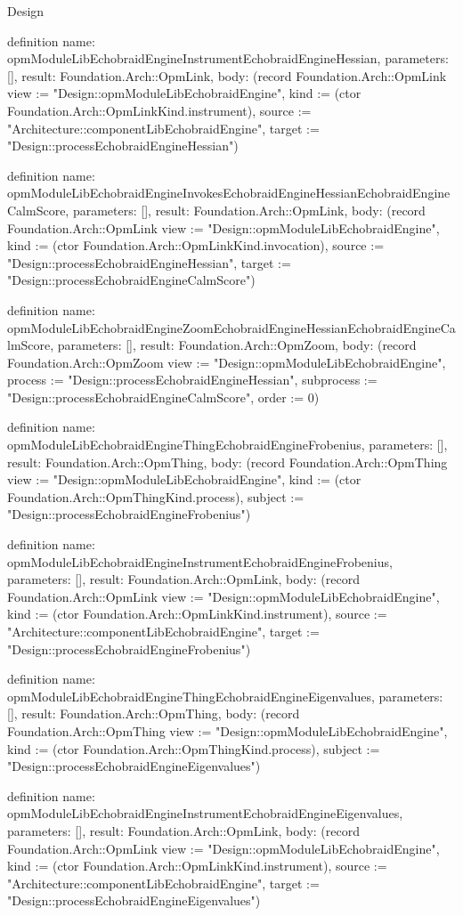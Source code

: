 \begin{lexlean}{Design}
\begin{semanticmodule}
definition{
  name: opmModuleLibEchobraidEngineInstrumentEchobraidEngineHessian,
  parameters: [],
  result: Foundation.Arch::OpmLink,
  body: (record Foundation.Arch::OpmLink {view := "Design::opmModuleLibEchobraidEngine", kind := (ctor Foundation.Arch::OpmLinkKind.instrument), source := "Architecture::componentLibEchobraidEngine", target := "Design::processEchobraidEngineHessian"})
}

definition{
  name: opmModuleLibEchobraidEngineInvokesEchobraidEngineHessianEchobraidEngineCalmScore,
  parameters: [],
  result: Foundation.Arch::OpmLink,
  body: (record Foundation.Arch::OpmLink {view := "Design::opmModuleLibEchobraidEngine", kind := (ctor Foundation.Arch::OpmLinkKind.invocation), source := "Design::processEchobraidEngineHessian", target := "Design::processEchobraidEngineCalmScore"})
}

definition{
  name: opmModuleLibEchobraidEngineZoomEchobraidEngineHessianEchobraidEngineCalmScore,
  parameters: [],
  result: Foundation.Arch::OpmZoom,
  body: (record Foundation.Arch::OpmZoom {view := "Design::opmModuleLibEchobraidEngine", process := "Design::processEchobraidEngineHessian", subprocess := "Design::processEchobraidEngineCalmScore", order := 0})
}

definition{
  name: opmModuleLibEchobraidEngineThingEchobraidEngineFrobenius,
  parameters: [],
  result: Foundation.Arch::OpmThing,
  body: (record Foundation.Arch::OpmThing {view := "Design::opmModuleLibEchobraidEngine", kind := (ctor Foundation.Arch::OpmThingKind.process), subject := "Design::processEchobraidEngineFrobenius"})
}

definition{
  name: opmModuleLibEchobraidEngineInstrumentEchobraidEngineFrobenius,
  parameters: [],
  result: Foundation.Arch::OpmLink,
  body: (record Foundation.Arch::OpmLink {view := "Design::opmModuleLibEchobraidEngine", kind := (ctor Foundation.Arch::OpmLinkKind.instrument), source := "Architecture::componentLibEchobraidEngine", target := "Design::processEchobraidEngineFrobenius"})
}

definition{
  name: opmModuleLibEchobraidEngineThingEchobraidEngineEigenvalues,
  parameters: [],
  result: Foundation.Arch::OpmThing,
  body: (record Foundation.Arch::OpmThing {view := "Design::opmModuleLibEchobraidEngine", kind := (ctor Foundation.Arch::OpmThingKind.process), subject := "Design::processEchobraidEngineEigenvalues"})
}

definition{
  name: opmModuleLibEchobraidEngineInstrumentEchobraidEngineEigenvalues,
  parameters: [],
  result: Foundation.Arch::OpmLink,
  body: (record Foundation.Arch::OpmLink {view := "Design::opmModuleLibEchobraidEngine", kind := (ctor Foundation.Arch::OpmLinkKind.instrument), source := "Architecture::componentLibEchobraidEngine", target := "Design::processEchobraidEngineEigenvalues"})
}


\end{semanticmodule}
\end{lexlean}
